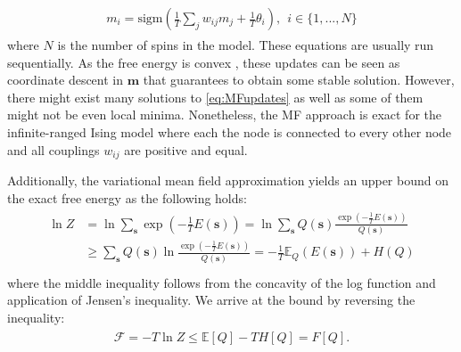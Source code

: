 \documentclass[../report/report.tex]{subfiles}
\begin{document}
\begin{align}
\begin{split}
m_i = \text{sigm}\left(\frac{1}{T}\sum_j w_{ij}m_j + \frac{1}{T} \theta_i \right), ~~ i \in \{1, ..., N\}
\label{eq:MFupdates}
\end{split}
\end{align}
where $N$ is the number of spins in the model. These equations are usually run sequentially. As the free energy is convex \cite{wainwright2008graphical}, these updates can be seen as coordinate descent in $\mathbf{m}$ that guarantees to obtain some stable solution. However, there might exist many solutions to \ref{eq:MFupdates} as well as some of them might not be even local minima. Nonetheless, the MF approach is exact for the infinite-ranged Ising model where each the node is connected to every other node and all couplings $w_{ij}$ are positive and equal\cite{kirkpatrick1978infinite}.

Additionally, the variational mean field approximation yields an upper bound on the exact free energy as the following holds:
\begin{align}
\begin{split}
\ln Z & = \ln \sum_{\mathbf{s}} \exp(-\frac{1}{T}E(\mathbf{s}))= \ln  \sum_{\mathbf{s}} Q(\mathbf{s}) \frac{ \exp(-\frac{1}{T}E(\mathbf{s}))}{Q(\mathbf{s})} \\
& \geqslant  \sum_{\mathbf{s}} Q(\mathbf{s}) \ln  \frac{ \exp(-\frac{1}{T}E(\mathbf{s}))}{Q(\mathbf{s})} = -\frac{1}{T}\mathbb{E}_Q(E(\mathbf{s})) + H(Q)\\
\end{split}
\end{align}
where the middle inequality follows from the concavity of the log function and application of Jensen's inequality. We arrive at the bound by reversing the inequality:
\begin{align}
\begin{split}
\mathcal{F} = - T \ln Z \leqslant \mathbb{E}[Q] - TH[Q] = F[Q].
\end{split}
\end{align}
\end{document}

